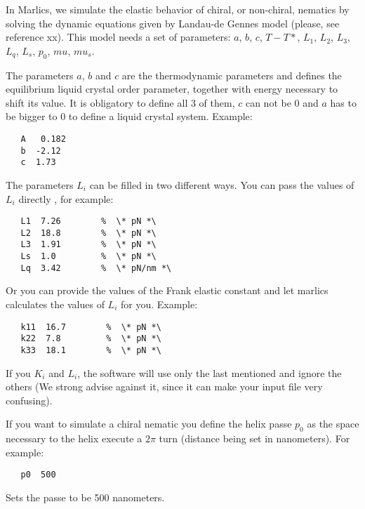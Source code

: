 \documentclass{article}
\begin{document}
In Marlics, we simulate the elastic behavior of chiral, or non-chiral, nematics by solving the dynamic equations given by Landau-de Gennes 
model (please, see reference xx). This model needs a set of parameters: $a$, $b$, $c$, $T-T*$, $L_1$, $L_2$, $L_3$, $L_q$, $L_s$, $p_0$, $mu$, $mu_s$.

The parameters $a$, $b$ and $c$ are the thermodynamic parameters and defines the equilibrium liquid crystal order parameter, together with energy necessary to shift its value. It is obligatory to define all 3 of them, $c$ can not be 0 and $a$ has to be bigger to 0 to define a liquid crystal system.
Example:
\begin{lstlisting}	
   A   0.182
   b  -2.12
   c  1.73
\end{lstlisting}


The parameters $L_i$ can be filled in two different ways. You can pass the values of $L_i$ directly , for example:
\begin{lstlisting}
   L1  7.26        %  \* pN *\
   L2  18.8        %  \* pN *\
   L3  1.91        %  \* pN *\
   Ls  1.0         %  \* pN *\
   Lq  3.42        %  \* pN/nm *\
\end{lstlisting}


Or you can provide the values of the Frank elastic constant and let marlics calculates the values of $L_i$ for you. Example:
\begin{lstlisting}
   k11  16.7        %  \* pN *\
   k22  7.8         %  \* pN *\
   k33  18.1        %  \* pN *\
\end{lstlisting}
If you  $K_i$ and $L_i$, the software will use only the last mentioned and ignore the others (We strong advise against it, since it can make your input file very confusing).

{If you want to simulate a chiral nematic you define the helix passe $p_0$} as the space necessary to the helix execute a $2 \pi$  turn (distance being set in nanometers). For example:

\begin{lstlisting}
   p0  500
\end{lstlisting}
Sets the passe to be 500 nanometers.
\end{document}
